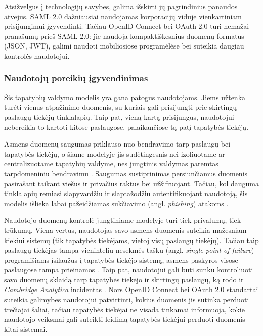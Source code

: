 Atsižvelgus į technologijų savybes, galima išskirti jų pagrindinius panaudos atvejus. SAML 2.0 dažniausiai naudojamas korporacijų viduje vienkartiniam prisijungimui
įgyvendinti. Tačiau OpenID Connect bei OAuth 2.0 turi nemažai pranašumų prieš SAML 2.0: jie naudoja kompaktiškesnius duomenų formatus (JSON, JWT), galimi naudoti
mobiliosiose programėlėse bei suteikia daugiau kontrolės naudotojui.

\subsubsection*{Naudotojų poreikių įgyvendinimas}

Šis tapatybių valdymo modelis yra gana patogus naudotojams. Jiems užtenka turėti vienus atpažinimo duomenis, su kuriais
gali prisijungti prie skirtingų paslaugų tiekėjų tinklalapių. Taip pat, vieną kartą prisijungus, naudotojui nebereikia to kartoti kitose paslaugose, 
palaikančiose tą patį tapatybės tiekėją.

Asmens duomenų saugumas priklauso nuo
bendravimo tarp paslaugų bei tapatybės tiekėjų, o šiame modelyje jis sudėtingesnis nei izoliuotame ar centralizuotame
tapatybių valdyme, nes jungtinis valdymas paremtas tarpdomeniniu bendravimu \cite{Maler2008}. Saugumas sustiprinimas persiunčiamus
duomenis pasirašant taikant viešus ir privačius raktus bei užšifruojant. Tačiau, kol dauguma tinklalapių remiasi slapyvardžiu ir slaptažodžiu autentifikuojant naudotoją,
šis modelis išlieka labai pažeidžiamas sukčiavimo (angl. \textit{phishing}) atakoms \cite{Maler2008}.

Naudotojo duomenų kontrolė jungtiniame 
modelyje turi tiek privalumų, tiek trūkumų. Viena vertus, naudotojas savo asmens duomenis suteikia mažesniam kiekiui sistemų (tik tapatybės tiekėjams,
vietoj visų paslaugų tiekėjų). Tačiau taip paslaugų tiekėjas tampa vieninteliu nesekmės tašku (angl. \textit{single point of failure}) - programišiams įsilaužus
į tapatybės tiekėjo sistemą, asmens paskyros visose paslaugose tampa prieinamos \cite{Pashalidis2003}. Taip pat, naudotojui gali būti sunku kontroliuoti
savo duomenų sklaidą tarp tapatybės tiekėjo ir skirtingų paslaugų, ką rodo ir \textit{Cambridge Analytica} incidentas \cite{CambridgeAnalytica}. Nors OpenID Connect bei OAuth 2.0
standartai suteikia galimybes naudotojui patvirtinti, kokius duomenis jis sutinka perduoti trečiajai šaliai, tačiau tapatybės tiekėjai ne visada tinkamai informuoja,
kokie naudotojo veiksmai gali suteikti leidimą tapatybės tiekėjui perduoti duomenis kitai sistemai.


